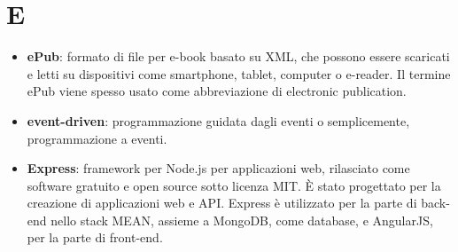 \section{E}
\begin{itemize} 
	\item \textbf{ePub}: formato di file per e-book basato su XML, che possono essere scaricati e letti su dispositivi come smartphone, tablet, computer o e-reader. Il termine ePub viene spesso usato come abbreviazione di electronic publication.
	\item \textbf{event-driven}: programmazione guidata dagli eventi o semplicemente, programmazione a eventi.
	\item \textbf{Express}: framework per Node.js per applicazioni web, rilasciato come software gratuito e open source sotto licenza MIT. È stato progettato per la creazione di applicazioni web e API. Express è utilizzato per la parte di back-end nello stack MEAN, assieme a MongoDB, come database, e AngularJS, per la parte di front-end.
\end{itemize}